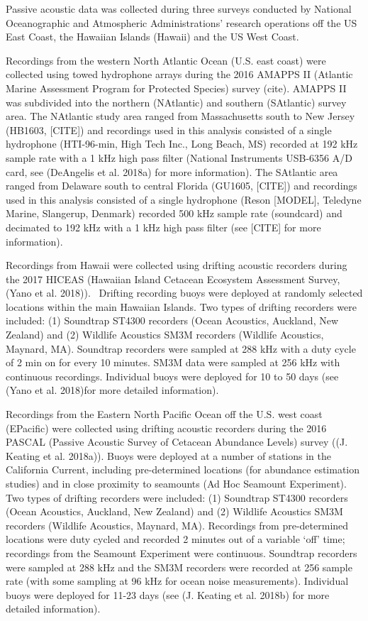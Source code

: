 \documentclass[
  letterpaper,
  DIV=11,
  numbers=noendperiod]{scrartcl}
\begin{document}
Passive acoustic data was collected during three surveys conducted by
National Oceanographic and Atmospheric Administrations' research
operations off the US East Coast, the Hawaiian Islands (Hawaii) and the
US West Coast.

Recordings from the western North Atlantic Ocean (U.S. east coast) were
collected using towed hydrophone arrays during the 2016 AMAPPS II
(Atlantic Marine Assessment Program for Protected Species) survey
(cite). AMAPPS II was subdivided into the northern (NAtlantic) and
southern (SAtlantic) survey area. The NAtlantic study area ranged from
Massachusetts south to New Jersey (HB1603, {[}CITE{]}) and recordings
used in this analysis consisted of a single hydrophone (HTI-96-min, High
Tech Inc., Long Beach, MS) recorded at 192 kHz sample rate with a 1 kHz
high pass filter (National Instruments USB-6356 A/D card, see (DeAngelis
et al. 2018a) for more information). The SAtlantic area ranged from
Delaware south to central Florida (GU1605, {[}CITE{]}) and recordings
used in this analysis consisted of a single hydrophone (Reson
{[}MODEL{]}, Teledyne Marine, Slangerup, Denmark) recorded 500 kHz
sample rate (soundcard) and decimated to 192 kHz with a 1 kHz high pass
filter (see {[}CITE{]} for more information).

Recordings from Hawaii were collected using drifting acoustic recorders
during the 2017 HICEAS (Hawaiian Island Cetacean Ecosystem Assessment
Survey, (Yano et al. 2018)).~ Drifting recording buoys were deployed at
randomly selected locations within the main Hawaiian Islands. Two types
of drifting recorders were included: (1) Soundtrap ST4300 recorders
(Ocean Acoustics, Auckland, New Zealand) and (2) Wildlife Acoustics SM3M
recorders (Wildlife Acoustics, Maynard, MA). Soundtrap recorders were
sampled at 288 kHz with a duty cycle of 2 min on for every 10 minutes.
SM3M data were sampled at 256 kHz with continuous recordings. Individual
buoys were deployed for 10 to 50 days (see (Yano et al. 2018)for more
detailed information).

Recordings from the Eastern North Pacific Ocean off the U.S. west coast
(EPacific) were collected using drifting acoustic recorders during the
2016 PASCAL (Passive Acoustic Survey of Cetacean Abundance Levels)
survey ((J. Keating et al. 2018a)). Buoys were deployed at a number of
stations in the California Current, including pre-determined locations
(for abundance estimation studies) and in close proximity to seamounts
(Ad Hoc Seamount Experiment). Two types of drifting recorders were
included: (1) Soundtrap ST4300 recorders (Ocean Acoustics, Auckland, New
Zealand) and (2) Wildlife Acoustics SM3M recorders (Wildlife Acoustics,
Maynard, MA). Recordings from pre-determined locations were duty cycled
and recorded 2 minutes out of a variable `off' time; recordings from the
Seamount Experiment were continuous. Soundtrap recorders were sampled at
288 kHz and the SM3M recorders were recorded at 256 sample rate (with
some sampling at 96 kHz for ocean noise measurements). Individual buoys
were deployed for 11-23 days (see (J. Keating et al. 2018b) for more
detailed information).
\end{document}
